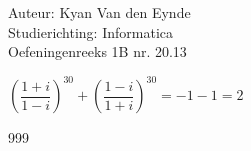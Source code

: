 \documentclass[a4paper]{article}
\begin{document}
  
\noindent \large Auteur: Kyan Van den Eynde \\
\noindent \large Studierichting: Informatica\\
\noindent \large Oefeningenreeks 1B nr. 20.13\\

\medskip

\normalsize

$\left(\dfrac{1+i}{1-i}\right)^{30} + \left(\dfrac{1-i}{1+i}\right)^{30} = -1-1 = 2$\\

\begin{thebibliography}{999}
\end{thebibliography}
\end{document}
